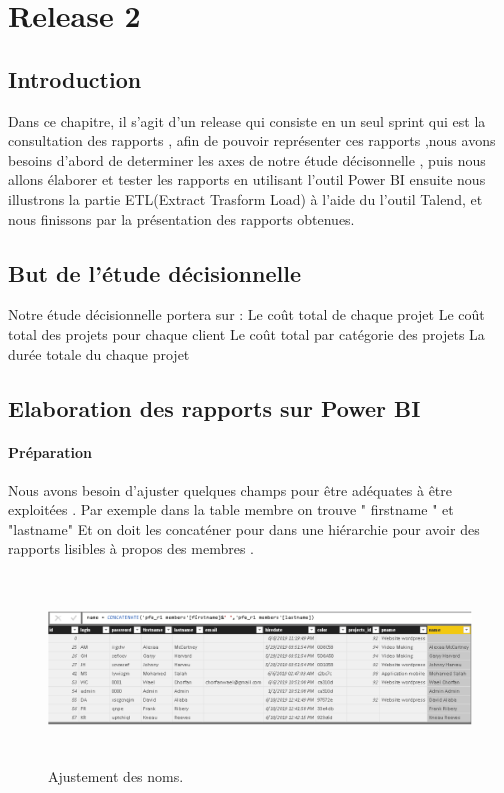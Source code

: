 \chapter{Release 2}


\section{Introduction}

Dans ce chapitre, il s'agit d'un release qui consiste en un seul sprint qui est la consultation des rapports ,
afin de pouvoir repr\'{e}senter ces rapports ,nous avons besoins d'abord de determiner
les axes de notre \'{e}tude d\'{e}cisonnelle , puis nous allons \'{e}laborer et tester les rapports en utilisant l'outil Power BI
ensuite nous illustrons la partie ETL(Extract Trasform Load) \`{a} l'aide du l'outil Talend,
et nous finissons par la pr\'{e}sentation des rapports obtenues.


\section{ But de l'\'{e}tude d\'{e}cisionnelle }

Notre \'{e}tude d\'{e}cisionnelle portera sur :
\textemdash{} Le co\^{u}t total de chaque projet
\textemdash{} Le co\^{u}t total des projets pour chaque client
\textemdash{} Le co\^{u}t total par cat\'{e}gorie des projets
\textemdash{} La dur\'{e}e totale du chaque projet
\section{ Elaboration des rapports sur Power BI }
\subsubsection{Pr\'{e}paration}
Nous avons besoin d'ajuster quelques champs pour \^{e}tre ad\'{e}quates \`{a} \^{e}tre
exploit\'{e}es . Par exemple dans la table membre on trouve " firstname " et
"lastname" Et on doit les concat\'{e}ner pour dans une hi\'{e}rarchie pour avoir
des rapports lisibles \`{a} propos des membres .




\FloatBarrier
\begin{figure}[H]
\center
\includegraphics[width=14cm,height=5cm]{./figures/pb1.png}
\caption{Ajustement des noms.}
\end{figure}
\FloatBarrier


